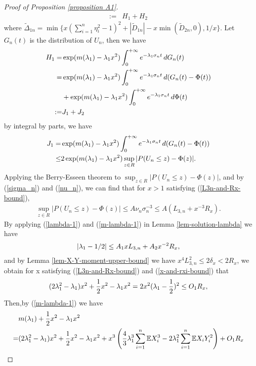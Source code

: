 \documentclass[bj,authoryear]{imsart}
\numberwithin{equation}{section}
\theoremstyle{plain}
\theoremstyle{definition}
\begin{document}
\begin{proof}[Proof of Proposition \ref{proposition A1}]
\begin{align}
  :=&H_1+H_2
\end{align}
where $\tilde{\Delta}_{1n} = \min\{x(\sum_{i = 1}^{n}\eta_{i}^{2}-1)^2 + |\tilde{D}_{1n}| - x\min(\tilde{D}_{2n},0),1/x\}$. Let $G_n(t)$ is the distribution of $U_n$, then we have 
\begin{align}
  H_1 =& \exp(m(\lambda_1)-\lambda_1x^2)\int_{0}^{+\infty}e^{-\lambda_{1}\sigma_{n}t}\,dG_n(t)\notag\\
  =& \exp(m(\lambda_1)-\lambda_1x^2)\int_{0}^{+\infty}e^{-\lambda_{1}\sigma_{n}t}\,d(G_n(t) - \Phi(t))\notag\\
  &+\exp(m(\lambda_1)-\lambda_1x^2)\int_{0}^{+\infty}e^{-\lambda_{1}\sigma_{n}t}\,d\Phi(t)\notag\\
  :=&J_1+J_2
\end{align}
by integral by parts, we have
\begin{align}
  J_{1} = &\exp(m(\lambda_1)-\lambda_1x^2)\int_{0}^{+\infty}e^{-\lambda_{1}\sigma_{n}t}\,d(G_n(t) - \Phi(t))\notag\\
  \leq& 2\exp(m(\lambda_1)-\lambda_1x^2)\sup_{z\in R}|P(U_n\leq z)-\Phi(z)|.\notag
\end{align}
Applying the Berry-Esseen theorem to $\sup_{z\in R}|P(U_n\leq z)-\Phi(z)|$, and by (\ref{sigma_n}) and (\ref{nu_n}), we can find that for $x>1$ satisfying (\ref{L3n-and-Rx-bound}),
\begin{align}
  \sup_{z\in R}|P(U_n\leq z)-\Phi(z)| \leq A\nu_n\sigma_{n}^{-3} \leq A(L_{3,n}+x^{-3}R_x).\label{Un-berry-esseen-bound}
\end{align}
By applying (\ref{lambda-1}) and (\ref{m-lambda-1}) in Lemma \ref{lem-solution-lambda} we have
\begin{align}
  |\lambda_1 - 1/2| \leq A_{1}xL_{3,n} + A_{2}x^{-2}R_{x},\notag
\end{align}
and by Lemma \ref{lem-X-Y-moment-upper-bound} we have $x^4L_{3,n}^{2}\leq 2\delta_{x}<2R_{x}$, we obtain for x satisfying (\ref{L3n-and-Rx-bound}) and (\ref{x-and-rxi-bound}) that 
\begin{align}
  (2\lambda_{1}^{2}-\lambda_{1})x^2+\frac{1}{2}x^2-\lambda_{1}x^2 = 2x^2(\lambda_{1}-\frac{1}{2})^2\leq O_{1}R_{x},\notag
\end{align}
Then,by (\ref{m-lambda-1}) we have
\begin{align}
  &m(\lambda_{1})+\frac{1}{2}x^2-\lambda_{1}x^2\notag\\
  = & (2\lambda_{1}^{2}-\lambda_1)x^2 + \frac{1}{2}x^2 -\lambda_{1}x^2 +x^3\left(\frac{4}{3}\lambda_{1}^{3}\sum_{i = 1}^{n}\mathbb{E}X_{i}^{3}-2\lambda_{1}^{2}\sum_{i = 1}^{n}\mathbb{E}X_{i}Y_{i}^{2}\right)+O_1R_{x}\notag\\

\end{align}
\end{proof}
\end{document}
